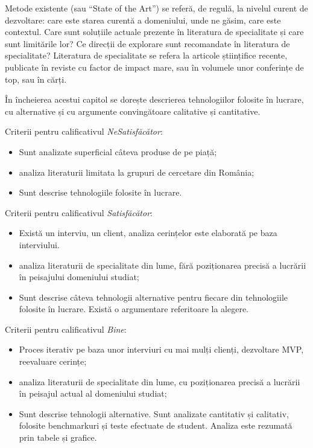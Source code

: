 \cercetare Metode existente (sau ``State of the Art'') se referă, de regulă, la nivelul curent de dezvoltare: care este starea curentă a domeniului, unde ne găsim, care este contextul. Care sunt soluțiile actuale prezente în literatura de specialitate și care sunt limitările lor? Ce direcții de explorare sunt recomandate în literatura de specialitate? Literatura de specialitate se refera la articole științifice recente, publicate în reviste cu factor de impact mare, sau în volumele unor conferințe de top, sau în cărți.

\ambele În încheierea acestui capitol se dorește descrierea tehnologiilor folosite în lucrare, cu alternative și cu argumente convingătoare calitative și cantitative.  

Criterii pentru calificativul \textit{Ne\textit{Satisfăcător}}: 
\begin{itemize}
	\item \dezvoltare Sunt analizate superficial câteva produse de pe piață; 
	\item \cercetare analiza literaturii limitata la grupuri de cercetare din România;
	\item \ambele Sunt descrise tehnologiile folosite în lucrare. 
\end{itemize}

Criterii pentru calificativul \textit{Satisfăcător}:
\begin{itemize}
	\item \dezvoltare Există un interviu, un client, analiza cerințelor este elaborată pe baza interviului.
	\item \cercetare analiza literaturii de specialitate din lume, fără poziționarea precisă a lucrării în peisajului domeniului studiat;
	\item \ambele Sunt descrise câteva tehnologii alternative pentru fiecare din tehnologiile folosite în lucrare. Există o argumentare referitoare la alegere.
\end{itemize}

Criterii pentru calificativul \textit{Bine}:
\begin{itemize}
	\item \dezvoltare Proces iterativ pe baza unor interviuri cu mai mulți clienți, dezvoltare MVP, reevaluare cerințe;
	\item \cercetare analiza literaturii de specialitate din lume, cu poziționarea precisă a lucrării în peisajul actual al domeniului studiat; 
	\item \ambele Sunt descrise tehnologii alternative. Sunt analizate cantitativ și calitativ, folosite benchmarkuri și teste efectuate de student. Analiza este rezumată prin tabele și grafice.
\end{itemize}


